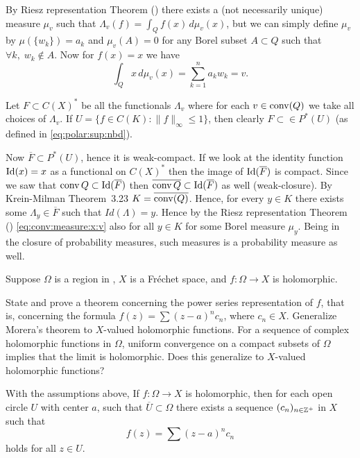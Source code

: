 \begin{enumerate}
By Riesz representation Theorem (\cite{RudinRCA80})
there exists a (not necessarily unique) measure \(\mu_v\) such that 
\(\Lambda_v(f) = \int_Q f(x)\,d\mu_v(x)\),
but we can simply define \(\mu_v\) by \(\mu(\{w_k\}) = a_k\)
and \(\mu_v(A) = 0\) for any Borel subset \(A\subset Q\)
such that \(\forall k,\; w_k\notin A\).
Now for \(f(x)=x\) we have
\begin{equation} \label{eq:conv:measure:x:v}
\int_Q x\,d\mu_v(x) = \sum_{k=1}^n a_k w_k = v.
\end{equation}

Let \(F\subset C(X)^*\) be all the functionals \(\Lambda_v\)
where for each \(v\in \mathop{\rm conv}\nolimits(Q)\) we take all choices of \(\Lambda_v\).
If \(U = \{f\in C(K): \|f\|_\infty \leq 1\}\), then  clearly
\(F \subset \in P^*(U)\) (as defined in \eqref{eq:polar:sup:nbd}).

Now \(\overline{F} \subset P^*(U)\), hence it is weak\upstar-compact.
If we look at the identity function \(\mathop{\rm Id}\nolimits(x)=x\)
as a functional on \(C(X)^*\) then the image of \(\mathop{\rm Id}\nolimits(\overline{F})\)
is compact. Since we saw that \(\mathop{\rm conv}\nolimits{Q} \subset \mathop{\rm Id}\nolimits(\overline{F})\)
then  \(\overline{\mathop{\rm conv}\nolimits{Q}} \subset \mathop{\rm Id}\nolimits(\overline{F})\) as well
(weak\upstar-closure).
By Krein-Milman
Theorem~3.23 \(K = \overline{\mathop{\rm conv}\nolimits(Q)}\).
Hence, for every \(y \in K\) there exists some 
\(\Lambda_y \in \overline{F}\) such that \(Id(\Lambda) = y\).
Hence by the Riesz  representation Theorem (\cite{RudinRCA80})
\eqref{eq:conv:measure:x:v} also for all \(y \in K\)
for some Borel measure \(\mu_y\).
Being in the closure of probability measures, such measures
is a probability measure as well.


\begin{excopy}
Suppose \(\Omega\) is a region in \C, $X$ is a Fr\'echet space, and
\(f:\Omega\to X\) is holomorphic.
\begin{itemize}
State and prove a theorem concerning the power series representation of $f$,
that is, concerning the formula \(f(z) = \sum(z-a)^n c_n\), where \(c_n\in X\).
Generalize Morera's theorem to $X$-valued holomorphic functions.
For a sequence of complex holomorphic functions in \(\Omega\),
uniform convergence on a compact subsets of \(\Omega\) implies that the limit
is holomorphic.
Does this generalize to $X$-valued holomorphic functions?
\end{itemize}
\end{excopy}

\begin{itemize}
With the assumptions above,
If \(f:\Omega \to X\) is holomorphic, then for each open circle $U$
with center $a$, such that \(\overline{U} \subset \Omega\)
there exists a sequence \((c_n)_{n\in\mathbb{Z}^+}\) in $X$ such that 
\begin{equation*}
f(z) = \sum(z-a)^n c_n
\end{equation*}
holds for all \(z\in U\).


\end{itemize}
\end{enumerate}
